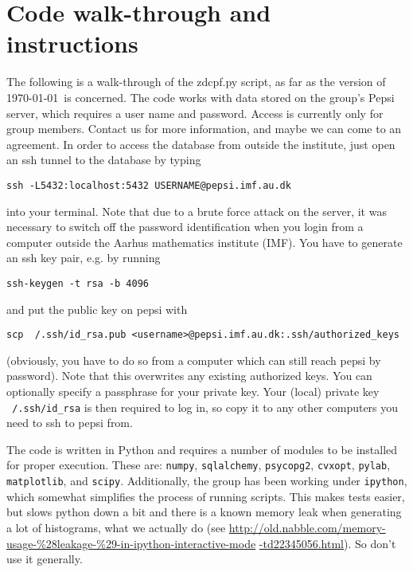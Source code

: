 \documentclass[english,twoside,a4paper,11pt]{article}
\numberwithin{equation}{section}
\begin{document}

\section{Code walk-through and instructions}

The following is a walk-through of the zdcpf.py script, as far
as the version of \today \ is concerned. The code works with data
stored on the group's Pepsi server, which requires a user name
and password. Access is currently only for group members. Contact us for more information, and maybe we can come to an agreement. In order to access
the database from outside the institute, just open an ssh tunnel to
the database by typing 

\noindent \texttt{ssh -L5432:localhost:5432 USERNAME@pepsi.imf.au.dk}

\noindent into your terminal. Note that due to a brute force attack on
the server, it was necessary to switch off the password identification
when you login from a computer outside the Aarhus mathematics institute
(IMF). You have to generate an ssh key pair, e.g. by running

\noindent \texttt{ssh-keygen -t rsa -b 4096}

and put the public key on pepsi with

\noindent \texttt{scp ~/.ssh/id\_rsa.pub
  <username>@pepsi.imf.au.dk:.ssh/authorized\_keys}

\noindent (obviously, you have to do so from a computer which can
still reach pepsi by password). Note that this overwrites any existing
authorized keys. You can optionally specify a passphrase for your
private key. Your (local) private key \texttt{~/.ssh/id\_rsa} is then required
to log in, so copy it to any other computers you need to ssh to pepsi
from.

The code is written in
Python and requires a number of modules to be installed for proper
execution. These are: \texttt{numpy}, \texttt{sqlalchemy},
\texttt{psycopg2}, \texttt{cvxopt}, \texttt{pylab},
\texttt{matplotlib}, and \texttt{scipy}. Additionally, the group has
been working under \texttt{ipython}, which somewhat simplifies the
process of running scripts. This makes tests easier, but slows python
down a bit and there is a known memory leak when generating a lot of
histograms, what we actually do (see
\url{http://old.nabble.com/memory-usage-%28leakage-%29-in-ipython-interactive-mode}
\url{-td22345056.html}). So don't use it generally.
\end{document}
